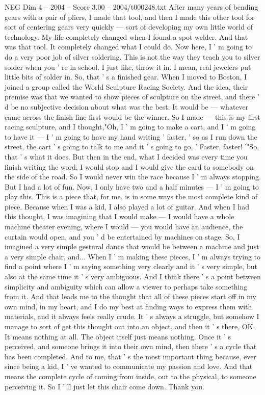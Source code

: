\begin{textsample}{NEG Dim 4 – 2004 – Score 3.00 – 2004/t000248.txt}
After many years of bending gears with a pair of pliers, I made that tool, and then I made this other tool for sort of centering gears very quickly — sort of developing my own little world of technology.
My life completely changed when I found a spot welder.
And that was that tool.
It completely changed what I could do.
Now here, I ' m going to do a very poor job of silver soldering.
This is not the way they teach you to silver solder when you ' re in school.
I just like, throw it in.
I mean, real jewelers put little bits of solder in.
So, that ' s a finished gear.
When I moved to Boston, I joined a group called the World Sculpture Racing Society.
And the idea, their premise was that we wanted to show pieces of sculpture on the street, and there ' d be no subjective decision about what was the best.
It would be — whatever came across the finish line first would be the winner.
So I made — this is my first racing sculpture, and I thought,"Oh, I ' m going to make a cart, and I ' m going to have it — I ' m going to have my hand writing ' faster, ' so as I run down the street, the cart ' s going to talk to me and it ' s going to go, ' Faster, faster! '"So, that ' s what it does.
But then in the end, what I decided was every time you finish writing the word, I would stop and I would give the card to somebody on the side of the road.
So I would never win the race because I ' m always stopping.
But I had a lot of fun.
Now, I only have two and a half minutes — I ' m going to play this.
This is a piece that, for me, is in some ways the most complete kind of piece.
Because when I was a kid, I also played a lot of guitar.
And when I had this thought, I was imagining that I would make — I would have a whole machine theater evening, where I would — you would have an audience, the curtain would open, and you ' d be entertained by machines on stage.
So, I imagined a very simple gestural dance that would be between a machine and just a very simple chair, and...
When I ' m making these pieces, I ' m always trying to find a point where I ' m saying something very clearly and it ' s very simple, but also at the same time it ' s very ambiguous.
And I think there ' s a point between simplicity and ambiguity which can allow a viewer to perhaps take something from it.
And that leads me to the thought that all of these pieces start off in my own mind, in my heart, and I do my best at finding ways to express them with materials, and it always feels really crude.
It ' s always a struggle, but somehow I manage to sort of get this thought out into an object, and then it ' s there, OK.
It means nothing at all.
The object itself just means nothing.
Once it ' s perceived, and someone brings it into their own mind, then there ' s a cycle that has been completed.
And to me, that ' s the most important thing because, ever since being a kid, I ' ve wanted to communicate my passion and love.
And that means the complete cycle of coming from inside, out to the physical, to someone perceiving it.
So I ' ll just let this chair come down.
Thank you.

\end{textsample}
